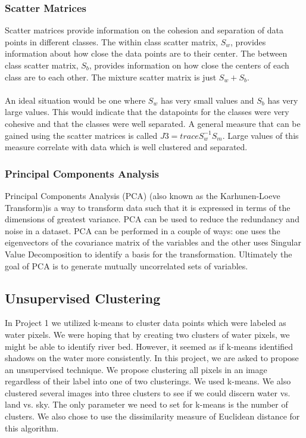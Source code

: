 \documentclass[12pt]{article}
\begin{document}
	\subsubsection{Scatter Matrices}
	Scatter matrices provide information on the cohesion and separation of data points in different classes. The within class scatter matrix, $S_w$, provides information about how close the data points are to their center. The between class scatter matrix, $S_b$, provides information on how close the centers of each class are to each other. The mixture scatter matrix is just $S_w + S_b$.\\
\\
	An ideal situation would be one where $S_w$ has very small values and $S_b$ has very large values. This would indicate that the datapoints for the classes were very cohesive and that the classes were well separated. 
	A general measure that can be gained using the scatter matrices is called $J3=trace{S_w^{-1}S_m}$. Large values of this measure correlate with data which is well clustered and separated.
	\subsubsection{Principal Components Analysis}
	Principal Components Analysis (PCA) (also known as the Karhunen-Loeve Transform)is a way to transform data such that it is expressed in terms of the dimensions of greatest variance\cite{Shlens2003pca}. PCA can be used to reduce the redundancy and noise in a dataset. PCA can be performed in a couple of ways: one uses the eigenvectors of the covariance matrix of the variables and the other uses Singular Value Decomposition to identify a basis for the transformation. Ultimately the goal of PCA is to generate mutually uncorrelated sets of variables\cite{theodoridis2009pattern}.
	\subsection{Unsupervised Clustering}
	In Project 1 we utilized k-means to cluster data points which were labeled as water pixels. We were hoping that by creating two clusters of water pixels, we might be able to identify river bed. However, it seemed as if k-means identified shadows on the water more consistently.  In this project, we are asked to propose an unsupervised technique. We propose clustering all pixels in an image regardless of their label into one of two clusterings. We used k-means. We also clustered several images into three clusters to see if we could discern water vs. land vs. sky. The only parameter we need to set for k-means is the number of clusters. We also chose to use the dissimilarity measure of Euclidean distance for this algorithm.
	
\end{document}
